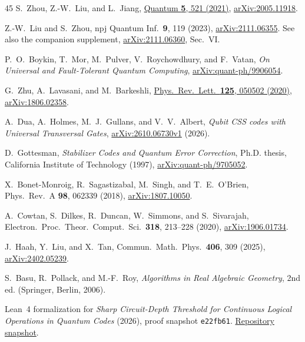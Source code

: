 \documentclass[aps,prl,reprint,notitlepage,nofootinbib,nobibnotes]{revtex4-2}
\begin{document}
\begin{thebibliography}{45}
S.~Zhou, Z.-W.~Liu, and L.~Jiang,
\href{https://quantum-journal.org/papers/q-2021-08-09-521/}{Quantum \textbf{5}, 521 (2021)},
\href{https://arxiv.org/abs/2005.11918}{arXiv:2005.11918}.

Z.-W.~Liu and S.~Zhou,
npj Quantum Inf.\ \textbf{9}, 119 (2023),
\href{https://arxiv.org/abs/2111.06355}{arXiv:2111.06355}.
See also the companion supplement, \href{https://arxiv.org/abs/2111.06360}{arXiv:2111.06360},
Sec.~VI.

P.~O.~Boykin, T.~Mor, M.~Pulver, V.~Roychowdhury, and F.~Vatan,
\emph{On Universal and Fault-Tolerant Quantum Computing},
\href{https://arxiv.org/abs/quant-ph/9906054}{arXiv:quant-ph/9906054}.

G.~Zhu, A.~Lavasani, and M.~Barkeshli,
\href{https://link.aps.org/doi/10.1103/PhysRevLett.125.050502}{Phys.\ Rev.\ Lett.\ \textbf{125},
050502 (2020)},
\href{https://arxiv.org/abs/1806.02358}{arXiv:1806.02358}.

A.~Dua, A.~Holmes, M.~J.~Gullans, and V.~V.~Albert,
\emph{Qubit CSS codes with Universal Transversal Gates},
\href{https://arxiv.org/abs/2610.06730v1}{arXiv:2610.06730v1} (2026).

D.~Gottesman,
\emph{Stabilizer Codes and Quantum Error Correction},
Ph.D. thesis, California Institute of Technology (1997),
\href{https://arxiv.org/abs/quant-ph/9705052}{arXiv:quant-ph/9705052}.

X.~Bonet-Monroig, R.~Sagastizabal, M.~Singh, and T.~E.~O'Brien,
Phys.\ Rev.\ A \textbf{98}, 062339 (2018),
\href{https://arxiv.org/abs/1807.10050}{arXiv:1807.10050}.

A.~Cowtan, S.~Dilkes, R.~Duncan, W.~Simmons, and S.~Sivarajah,
Electron.\ Proc.\ Theor.\ Comput.\ Sci.\ \textbf{318}, 213--228 (2020),
\href{https://arxiv.org/abs/1906.01734}{arXiv:1906.01734}.

J.~Haah, Y.~Liu, and X.~Tan,
Commun.\ Math.\ Phys.\ \textbf{406}, 309 (2025),
\href{https://arxiv.org/abs/2402.05239}{arXiv:2402.05239}.

S.~Basu, R.~Pollack, and M.-F.~Roy,
\emph{Algorithms in Real Algebraic Geometry},
2nd ed. (Springer, Berlin, 2006).

Lean~4 formalization for \emph{Sharp Circuit-Depth Threshold for Continuous Logical
Operations in Quantum Codes} (2026), proof snapshot \texttt{e22fb61}.
\href{https://github.com/Imine20/critical-depth-for-the-infinite-logical-set/tree/e22fb613f4463e0da04c1b0d6c2ea20eacf80c61}{Repository snapshot}.


\end{thebibliography}
\end{document}
